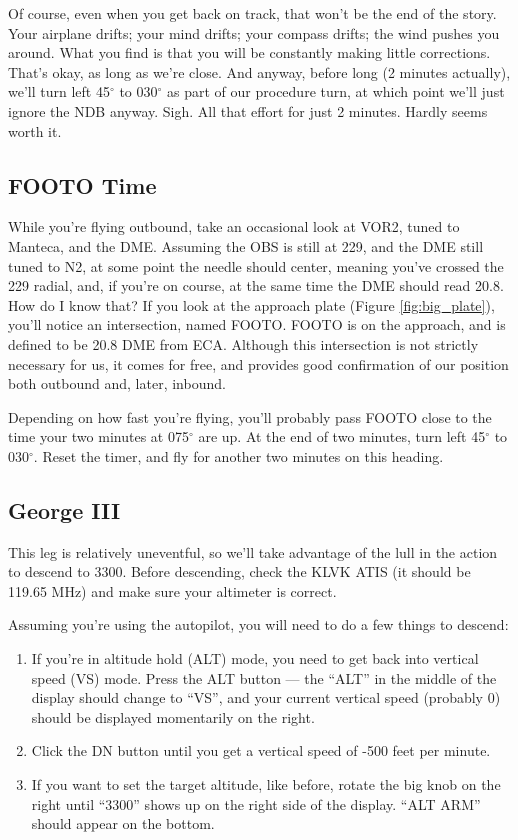 Of course, even when you get back on track, that won't be the end of
the story.  Your airplane drifts; your mind drifts; your compass
drifts; the wind pushes you around.  What you find is that you will be
constantly making little corrections.  That's okay, as long as we're
close.  And anyway, before long (2 minutes actually), we'll turn left
45$^\circ$ to 030$^\circ$ as part of our procedure turn, at which
point we'll just ignore the NDB anyway.  Sigh.  All that effort for
just 2 minutes.  Hardly seems worth it.

\subsection{FOOTO Time}

While you're flying outbound, take an occasional look at VOR2, tuned
to Manteca, and the DME.  Assuming the OBS is still at 229, and the
DME still tuned to N2, at some point the needle should center, meaning
you've crossed the 229 radial, and, if you're on course, at the same
time the DME should read 20.8.  How do I know that?  If you look at
the approach plate (Figure \ref{fig:big_plate}), you'll notice an
intersection, named FOOTO.  FOOTO is on the approach, and is defined
to be 20.8 DME from ECA.  Although this intersection is not strictly
necessary for us, it comes for free, and provides good confirmation of
our position both outbound and, later, inbound.

Depending on how fast you're flying, you'll probably pass FOOTO close
to the time your two minutes at 075$^\circ$ are up.  At the end of two
minutes, turn left 45$^\circ$ to 030$^\circ$.  Reset the timer, and
fly for another two minutes on this heading.

\subsection{George III}

This leg is relatively uneventful, so we'll take advantage of the lull
in the action to descend to 3300. Before
descending, check the KLVK ATIS (it should be 119.65 MHz) and make
sure your altimeter is correct.

Assuming you're using the autopilot, you will need to do a few things
to descend:

\begin{enumerate}
\item If you're in altitude hold (ALT) mode, you need to get back into
  vertical speed (VS) mode.  Press the ALT button --- the ``ALT'' in
  the middle of the display should change to ``VS'', and your current
  vertical speed (probably 0) should be displayed momentarily on the
  right.
\item Click the DN button until you get a vertical speed of -500 feet
  per minute.
\item If you want to set the target altitude, like before, rotate the
  big knob on the right until ``3300'' shows up on the right side of
  the display.  ``ALT ARM'' should appear on the bottom.
\end{enumerate}


